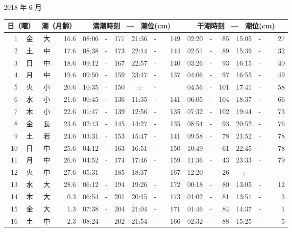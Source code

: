 \documentclass[12pt.a4j]{jsarticle}
\begin{document}
\begin{center}
 {\large 2018 年  6 月}\\
 \begin{table}[ht]
    \begin{tabular}{|rc|cr|ccrccr|ccrccr|}
    \hline
    \multicolumn{2}{|c|}{日（曜）} & \multicolumn{2}{c|}{潮（月齢）} & \multicolumn{6}{c|}{満潮時刻　―　潮位(cm)} & \multicolumn{6}{c|}{干潮時刻　―　潮位(cm)} \\
 \hline
 1 & 金 & 大 & 16.6 &  08:06 &-& 177  &  21:36 &-& 149  &   02:20 &-&  85  &   15:05 &-&  27  \\
 2 & 土 & 中 & 17.6 &  08:38 &-& 173  &  22:14 &-& 144  &   02:51 &-&  89  &   15:39 &-&  32  \\
 3 & 日 & 中 & 18.6 &  09:12 &-& 167  &  22:57 &-& 140  &   03:26 &-&  93  &   16:15 &-&  40  \\
 4 & 月 & 中 & 19.6 &  09:50 &-& 159  &  23:47 &-& 137  &   04:06 &-&  97  &   16:55 &-&  49  \\
 5 & 火 & 小 & 20.6 &  10:35 &-& 150  &  --:-- &-&~~~~~ &   04:56 &-& 101  &   17:41 &-&  58  \\
 6 & 水 & 小 & 21.6 &  00:45 &-& 136  &  11:35 &-& 141  &   06:05 &-& 104  &   18:37 &-&  66  \\
 7 & 木 & 小 & 22.6 &  01:47 &-& 139  &  12:56 &-& 135  &   07:32 &-& 102  &   19:44 &-&  73  \\
 8 & 金 & 長 & 23.6 &  02:43 &-& 145  &  14:27 &-& 135  &   08:54 &-&  93  &   20:52 &-&  76  \\
 9 & 土 & 若 & 24.6 &  03:31 &-& 153  &  15:47 &-& 141  &   09:58 &-&  78  &   21:52 &-&  78  \\
10 & 日 & 中 & 25.6 &  04:12 &-& 163  &  16:51 &-& 150  &   10:49 &-&  61  &   22:45 &-&  78  \\
11 & 月 & 中 & 26.6 &  04:52 &-& 174  &  17:46 &-& 159  &   11:36 &-&  43  &   23:33 &-&  79  \\
12 & 火 & 中 & 27.6 &  05:31 &-& 185  &  18:37 &-& 167  &   12:20 &-&  26  &   --:-- &-&~~~~~ \\
13 & 水 & 大 & 28.6 &  06:12 &-& 194  &  19:26 &-& 172  &   00:18 &-&  80  &   13:05 &-&  12  \\
14 & 木 & 大 &  0.3 &  06:54 &-& 201  &  20:15 &-& 173  &   01:02 &-&  81  &   13:51 &-&   3  \\
15 & 金 & 大 &  1.3 &  07:38 &-& 204  &  21:04 &-& 171  &   01:46 &-&  84  &   14:37 &-&   1  \\
16 & 土 & 中 &  2.3 &  08:24 &-& 202  &  21:54 &-& 166  &   02:32 &-&  88  &   15:25 &-&   5  \\

\end{tabular}
\end{table}
\end{center}
\end{document}
